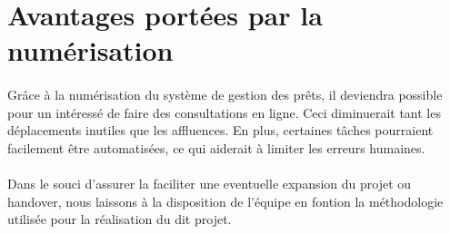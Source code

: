     \section{Avantages portées par la numérisation}
\paragraph{}
Grâce à la numérisation du système de gestion des prêts,
il deviendra possible pour un intéressé de faire des consultations
en ligne. Ceci diminuerait tant les déplacements inutiles que les 
affluences. En plus, certaines tâches pourraient facilement être 
automatisées, ce qui aiderait à limiter les erreurs humaines.   
\paragraph{}
Dans le souci d'assurer la faciliter une eventuelle expansion du projet ou handover, nous laissons à la disposition de l'équipe en fontion la méthodologie utilisée pour la réalisation du dit projet.